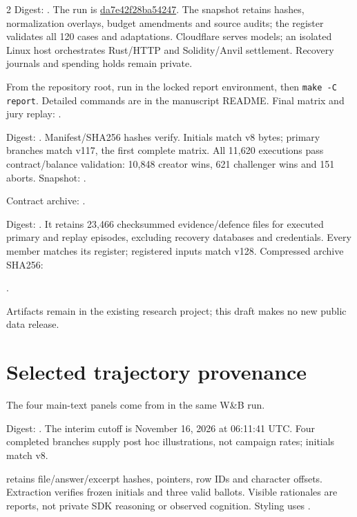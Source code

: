 \begin{multicols}{2}
Digest: . The run is
\href{https://forge.coreweave.com/wandb/lbxa-corp/apart-epistemics-sprint/runs/da7e42f28ba54247}{da7e42f28ba54247}.
The snapshot retains hashes, normalization overlays, budget amendments and
source audits; the register validates all 120 cases and adaptations.
Cloudflare serves models; an isolated Linux host orchestrates Rust/HTTP and
Solidity/Anvil settlement. Recovery journals and spending holds remain private.

From the repository root, run
 in the locked report environment,
then \texttt{make -C report}. Detailed commands are in the manuscript README.
Final matrix and jury replay: .

Digest: . Manifest/SHA256 hashes verify.
Initials match v8 bytes; primary branches match v117, the first complete matrix.
All 11,620 executions pass contract/balance validation: 10,848 creator wins,
621 challenger wins and 151 aborts. Snapshot: .

Contract archive: .

Digest: . It retains 23,466 checksummed
evidence/defence files for executed primary and replay episodes, excluding
recovery databases and credentials. Every member matches its register;
registered inputs match v128.
Compressed archive SHA256:

.

Artifacts remain in the existing research project; this draft makes no new
public data release.

\section{Selected trajectory provenance}
\label{app:excerpt-provenance}
The four main-text panels come from
 in the same W\&B run.

Digest: .
The interim cutoff is November 16, 2026 at 06:11:41 UTC. Four completed
branches supply post hoc illustrations, not campaign rates; initials match v8.

 retains file/answer/excerpt hashes,
pointers, row IDs and character offsets. Extraction verifies frozen initials
and three valid ballots. Visible rationales are reports, not private SDK
reasoning or observed cognition. Styling uses .


\end{multicols}
